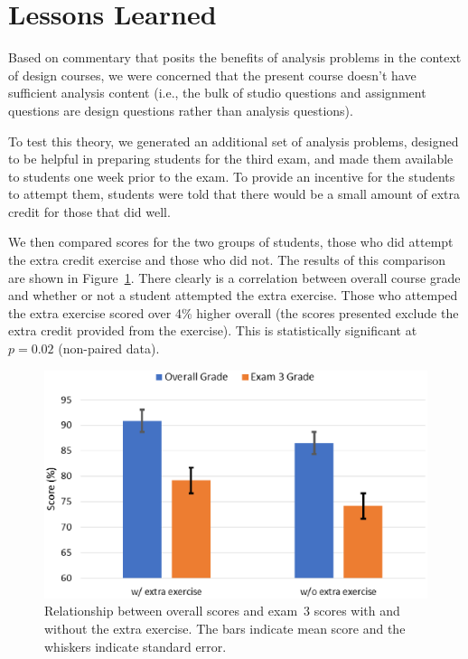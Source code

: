 \section{Lessons Learned}
\label{sec:lessons}




Based on commentary that posits the benefits of analysis problems
in the context of design courses, we were concerned that the present
course doesn't have sufficient analysis content (i.e., the bulk of
studio questions and assignment questions are design questions rather
than analysis questions).

To test this theory, we generated an additional set of analysis problems,
designed to be helpful in preparing students for the third exam, and
made them available to students one week prior to the exam.  To provide
an incentive for the students to attempt them, students were told that
there would be a small amount of extra credit for those that did well.

We then compared scores for the two groups of students, those who did
attempt the extra credit exercise and those who did not.  The results
of this comparison are shown in Figure~\ref{fig:scores}.
There clearly is a correlation between overall course grade and
whether or not a student attempted the extra exercise.
Those who attemped the extra exercise scored over 4\% higher overall
(the scores presented exclude the extra credit provided from the
exercise).  This is statistically significant at $p = 0.02$ (non-paired data).

\begin{figure}[ht]
\centering
\includegraphics[width=\columnwidth]{scores}
\caption{Relationship between overall scores and exam~3 scores
with and without the extra exercise. The bars indicate mean score and
the whiskers indicate standard error.}
\label{fig:scores}
\end{figure}

